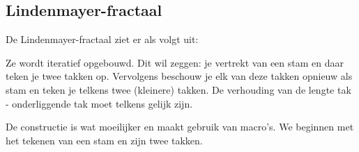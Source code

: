\subsection{Lindenmayer-fractaal}
De Lindenmayer-fractaal ziet er als volgt uit:
\begin{center}
\setlength{\fboxrule}{1.pt}
\setlength{\fboxsep}{0.1pt}
\end{center}

Ze wordt iteratief opgebouwd. Dit wil zeggen: je vertrekt van een stam en daar teken je twee takken op. Vervolgens beschouw je elk van deze takken opnieuw als stam en teken je telkens twee (kleinere) takken. De verhouding van de lengte tak - onderliggende tak moet telkens gelijk zijn.
\begin{center}
\setlength{\fboxrule}{1.pt}
\setlength{\fboxsep}{0.1pt}
\scalebox{0.5}
{}
\end{center}
De constructie is wat moeilijker en maakt gebruik van macro's. We beginnen met het tekenen van een stam en zijn twee takken.

